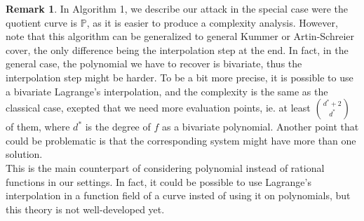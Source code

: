 \documentclass[10pt]{article}
\theoremstyle{definition}
\theoremstyle{definition}
\newtheorem{rq1}[thm]{Remark}
\theoremstyle{definition}
\newcommand{\s}{\vspace{0.3cm}}
\newcommand{\PP}{\mathbb{P}}
\begin{document}
\s

\begin{rq1}
In Algorithm 1, we describe our attack in the special case were the quotient curve is $\PP$, as it is easier to produce a complexity analysis. However, note that this algorithm can be generalized to general Kummer or Artin-Schreier cover, the only difference being the interpolation step at the end. In fact, in the general case, the polynomial we have to recover is bivariate, thus the interpolation step might be harder. To be a bit more precise, it is possible to use a bivariate Lagrange's interpolation, and the complexity is the same as the classical case, exepted that we need more evaluation points, ie. at least \color{purple} $\binom{d^*+2}{d^*}$ of them, where $d^*$ is the degree of $f$ as a bivariate polynomial.\color{black}  Another point that could be problematic is that the corresponding system might have more than one solution. \\
This is the main counterpart of considering polynomial instead of rational functions in our settings. In fact, it could be possible to use Lagrange's interpolation in a function field of a curve insted of using it on polynomials, but this theory is not well-developed yet.
\end{rq1}
\end{document}
